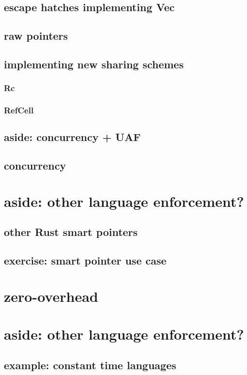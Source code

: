 \subsection{escape hatches implementing Vec}


\subsection{raw pointers}



\subsection{implementing new sharing schemes}

\subsubsection{Rc}


\subsubsection{RefCell}


\subsection{aside: concurrency + UAF}


\subsection{concurrency}


\section{aside: other language enforcement?}



\subsection{other Rust smart pointers}

\subsection{exercise: smart pointer use case}



\section{zero-overhead}


\section{aside: other language enforcement?}


\subsection{example: constant time languages}


